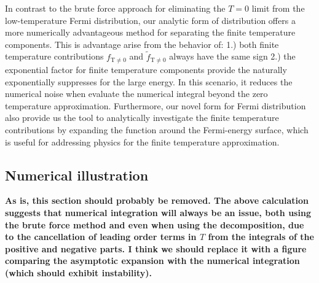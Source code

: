 \documentclass[sn-mathphys,Numbered]{sn-jnl}
\begin{document}
In contrast to the brute force approach for eliminating the $T=0$ limit from the low-temperature Fermi distribution, our analytic form of distribution offers a more numerically advantageous method for separating the finite temperature components. This is advantage arise from the behavior of: 1.) both finite temperature contributions $f_\mathrm{T\neq0}$ and $\widetilde f_\mathrm{T\neq0}$ always have the same sign 2.) the exponential factor for finite temperature components provide the naturally exponentially suppresses for the large energy. In this scenario, it reduces the numerical noise when evaluate the numerical integral beyond the zero temperature approximation. Furthermore, our novel form for Fermi distribution also provide us the tool to analytically investigate the finite temperature contributions by expanding the function around the Fermi-energy surface, which is useful for addressing physics for the finite temperature approximation.


\subsection{Numerical illustration}
{\bf As is, this section should probably be removed.  The above calculation suggests that numerical integration will always be an issue, both using  the brute force method and even when using the decomposition, due to the cancellation of leading order terms in $T$ from the integrals of the positive and negative parts.  I think we should replace it with a figure comparing the asymptotic expansion with the numerical integration (which should exhibit instability).  }
\end{document}
